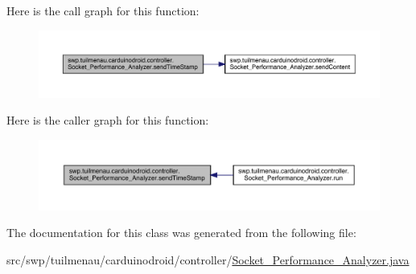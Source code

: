 Here is the call graph for this function\+:
\nopagebreak
\begin{figure}[H]
\begin{center}
\leavevmode
\includegraphics[width=350pt]{classswp_1_1tuilmenau_1_1carduinodroid_1_1controller_1_1_socket___performance___analyzer_a7cb9ff89df5010aada87f12106ae780f_cgraph}
\end{center}
\end{figure}




Here is the caller graph for this function\+:
\nopagebreak
\begin{figure}[H]
\begin{center}
\leavevmode
\includegraphics[width=350pt]{classswp_1_1tuilmenau_1_1carduinodroid_1_1controller_1_1_socket___performance___analyzer_a7cb9ff89df5010aada87f12106ae780f_icgraph}
\end{center}
\end{figure}




The documentation for this class was generated from the following file\+:\begin{DoxyCompactItemize}
\item 
src/swp/tuilmenau/carduinodroid/controller/\hyperlink{_socket___performance___analyzer_8java}{Socket\+\_\+\+Performance\+\_\+\+Analyzer.\+java}\end{DoxyCompactItemize}
